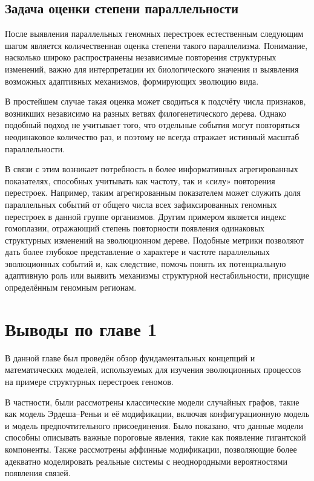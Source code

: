 \subsection{Задача оценки степени параллельности}
\label{subsec:parallelism_estimation}

После выявления параллельных геномных перестроек естественным следующим шагом является количественная оценка степени такого параллелизма.
Понимание, насколько широко распространены независимые повторения структурных изменений, важно для интерпретации их биологического значения и выявления возможных адаптивных механизмов, формирующих эволюцию вида.

В простейшем случае такая оценка может сводиться к подсчёту числа признаков, возникших независимо на разных ветвях филогенетического дерева.
Однако подобный подход не учитывает того, что отдельные события могут повторяться неодинаковое количество раз, и поэтому не всегда отражает истинный масштаб параллельности. 

В связи с этим возникает потребность в более информативных агрегированных показателях, способных учитывать как частоту, так и «силу» повторения перестроек.
Например, таким агрегированным показателем может служить доля параллельных событий от общего числа всех зафиксированных геномных перестроек в данной группе организмов.
Другим примером является индекс гомоплазии, отражающий степень повторности появления одинаковых структурных изменений на эволюционном дереве.
Подобные метрики позволяют дать более глубокое представление о характере и частоте параллельных эволюционных событий и, как следствие, помочь понять их потенциальную адаптивную роль или выявить механизмы структурной нестабильности, присущие определённым геномным регионам.

\section*{Выводы по главе 1}

В данной главе был проведён обзор фундаментальных концепций и математических моделей, используемых для изучения эволюционных процессов на примере структурных перестроек геномов.

В частности, были рассмотрены классические модели случайных графов, такие как модель Эрдеша–Реньи и её модификации, включая конфигурационную модель и модель предпочтительного присоединения.
Было показано, что данные модели способны описывать важные пороговые явления, такие как появление гигантской компоненты.
Также рассмотрены аффинные модификации, позволяющие более адекватно моделировать реальные системы с неоднородными вероятностями появления связей.


